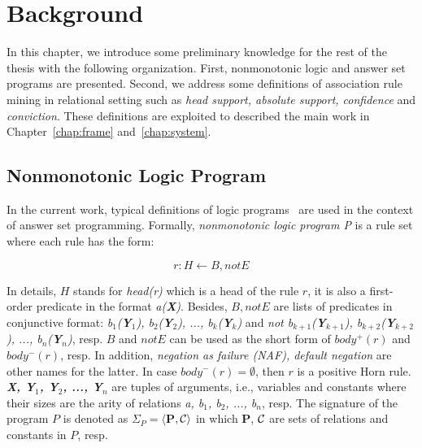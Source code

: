 \chapter{Background}
\label{chap:back}

In this chapter, we introduce some preliminary knowledge for the rest of the thesis with the following organization. First, nonmonotonic logic and answer set programs are presented. Second, we address some definitions of association rule mining in relational setting such as \textit{head support, absolute support, confidence} and \textit{conviction}. These definitions are exploited to described the main work in Chapter~\ref{chap:frame} and~\ref{chap:system}.

\section{Nonmonotonic Logic Program}

In the current work, typical definitions of logic programs~\cite{ref49} are used in the context of answer set programming. Formally, \textit{nonmonotonic logic program P} is a rule set where each rule has the form:

\begin{equation}
r: H \leftarrow B, not E
\end{equation}
\label{rule3}

In details, $H$ stands for \textit{head(r)} which is a head of the rule $r$, it is also a first-order predicate in the format \textit{a(\textbf{X})}. Besides, $B, not E$ are lists of predicates in conjunctive format: \textit{b$_1$(\textbf{Y}$_1$), b$_2$(\textbf{Y}$_2$), ..., b$_k$(\textbf{Y}$_k$)} and \textit{not b$_{k+1}$(\textbf{Y}$_{k+1}$), b$_{k+2}$(\textbf{Y}$_{k+2}$), ..., b$_n$(\textbf{Y}$_n$)}, resp. $B$ and $not E$ can be used as the short form of $body^+(r)$ and $body^-(r)$, resp. In addition, \textit{negation as failure (NAF), default negation} are other names for the latter. In case $body^-(r) = \emptyset$, then $r$ is a positive Horn rule. \textit{\textbf{X, Y$_{1}$, Y$_{2}$, ..., Y$_{n}$}} are tuples of arguments, i.e., variables and constants where their sizes are the arity of relations \textit{a, b$_1$, b$_2$, ..., b$_n$}, resp. The signature of the program $P$ is denoted as $\Sigma_{P} = \langle$\textbf{P}$, \mathcal{C}\rangle$ in which \textbf{P}, $\mathcal{C}$ are sets of relations and constants in $P$, resp.

